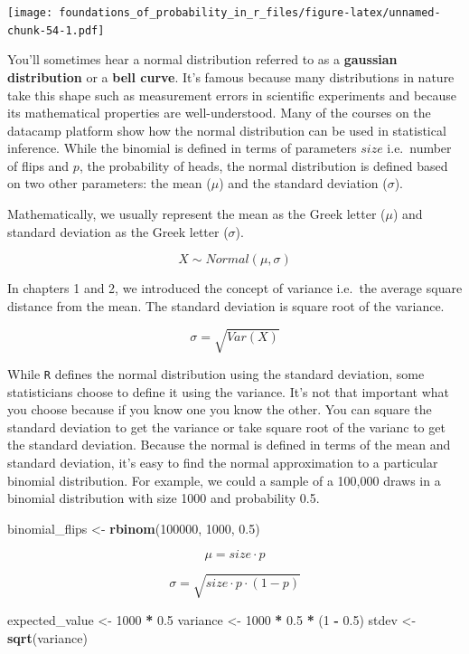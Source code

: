\documentclass[]{article}
\newenvironment{Shaded}{\begin{snugshade}}{\end{snugshade}}
\newcommand{\DecValTok}[1]{\textcolor[rgb]{0.00,0.00,0.81}{#1}}
\newcommand{\FloatTok}[1]{\textcolor[rgb]{0.00,0.00,0.81}{#1}}
\newcommand{\KeywordTok}[1]{\textcolor[rgb]{0.13,0.29,0.53}{\textbf{#1}}}
\newcommand{\NormalTok}[1]{#1}
\newcommand{\OperatorTok}[1]{\textcolor[rgb]{0.81,0.36,0.00}{\textbf{#1}}}
\newcommand{\StringTok}[1]{\textcolor[rgb]{0.31,0.60,0.02}{#1}}
\begin{document}
\texttt{[image: foundations\_of\_probability\_in\_r\_files/figure-latex/unnamed-chunk-54-1.pdf]}

You'll sometimes hear a normal distribution referred to as a
\textbf{gaussian distribution} or a \textbf{bell curve}. It's famous
because many distributions in nature take this shape such as measurement
errors in scientific experiments and because its mathematical properties
are well-understood. Many of the courses on the datacamp platform show
how the normal distribution can be used in statistical inference. While
the binomial is defined in terms of parameters \(size\) i.e.~number of
flips and \(p\), the probability of heads, the normal distribution is
defined based on two other parameters: the mean (\(\mu\)) and the
standard deviation (\(\sigma\)).

Mathematically, we usually represent the mean as the Greek letter
(\(\mu\)) and standard deviation as the Greek letter (\(\sigma\)).

\[X \sim Normal(\mu, \sigma)\]

In chapters 1 and 2, we introduced the concept of variance i.e.~the
average square distance from the mean. The standard deviation is square
root of the variance.

\[\sigma = \sqrt{Var(X)}\]

While \texttt{R} defines the normal distribution using the standard
deviation, some statisticians choose to define it using the variance.
It's not that important what you choose because if you know one you know
the other. You can square the standard deviation to get the variance or
take square root of the varianc to get the standard deviation. Because
the normal is defined in terms of the mean and standard deviation, it's
easy to find the normal approximation to a particular binomial
distribution. For example, we could a sample of a 100,000 draws in a
binomial distribution with size 1000 and probability 0.5.

\begin{Shaded}
\begin{Highlighting}[]
\NormalTok{binomial_flips <-}\StringTok{ }\KeywordTok{rbinom}\NormalTok{(}\DecValTok{100000}\NormalTok{, }\DecValTok{1000}\NormalTok{, }\FloatTok{0.5}\NormalTok{)}
\end{Highlighting}
\end{Shaded}

\[\mu = size \cdot p\]

\[\sigma = \sqrt{size \cdot p \cdot (1 - p)}\]

\begin{Shaded}
\begin{Highlighting}[]
\NormalTok{expected_value <-}\StringTok{ }\DecValTok{1000} \OperatorTok{*}\StringTok{ }\FloatTok{0.5}
\NormalTok{variance <-}\StringTok{ }\DecValTok{1000} \OperatorTok{*}\StringTok{ }\FloatTok{0.5} \OperatorTok{*}\StringTok{ }\NormalTok{(}\DecValTok{1} \OperatorTok{-}\StringTok{ }\FloatTok{0.5}\NormalTok{)}
\NormalTok{stdev <-}\StringTok{ }\KeywordTok{sqrt}\NormalTok{(variance)}
\end{Highlighting}
\end{Shaded}
\end{document}
